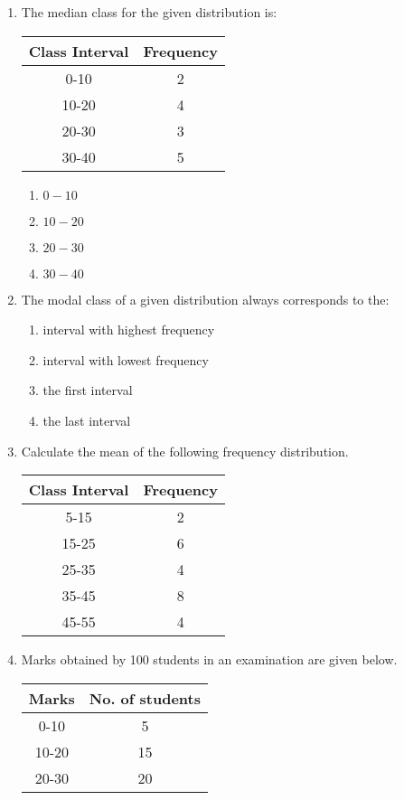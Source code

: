 \begin{enumerate}
	\item The median class for the given distribution is:\\
		\centering
		\begin{tabular}{|c|c|}
			\hline
			Class Interval & Frequency \\
			\hline
			0-10 & 2 \\
			10-20 & 4\\
			20-30 & 3\\
			30-40 & 5\\ 
			\hline
		\end{tabular}
		\begin{enumerate}
			\item $0-10$
			\item $10-20$
			\item $20-30$
			\item $30-40$
		\end{enumerate}
	\item The modal class of a given distribution always corresponds to the:
		\begin{enumerate}
			\item interval with highest frequency 
			\item interval with lowest frequency
			\item the first interval
			\item the last interval
		\end{enumerate}
	\item Calculate the mean of the following frequency distribution.\\
		\centering
		\begin{tabular}{|c|c|}
			\hline
			Class Interval & Frequency \\
			\hline
			5-15 & 2 \\
			15-25 & 6 \\
			25-35 & 4 \\
			35-45 & 8 \\
			45-55 & 4\\
			\hline
		\end{tabular}
	\item Marks obtained by 100 students in an examination are given below.
		\centering
		\begin{tabular}{|c|c|}
			\hline
			Marks & No. of students \\
			\hline
			0-10 & 5 \\
			10-20 & 15 \\
			20-30 & 20 \\

\end{tabular}
\end{enumerate}
